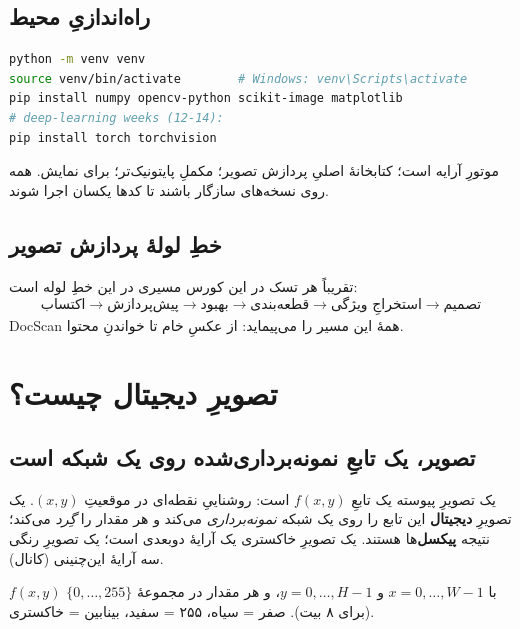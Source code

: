 \documentclass[12pt,a4paper]{article}
\begin{document}
\subsection{راه‌اندازیِ محیط}

\begin{ltrcode}
\begin{lstlisting}[language=bash]
python -m venv venv
source venv/bin/activate        # Windows: venv\Scripts\activate
pip install numpy opencv-python scikit-image matplotlib
# deep-learning weeks (12-14):
pip install torch torchvision
\end{lstlisting}
\end{ltrcode}

 موتورِ آرایه است؛  کتابخانهٔ اصلیِ پردازش تصویر؛  مکملِ
پایتونیک‌تر؛  برای نمایش. همه روی نسخه‌های سازگار باشند تا کدها یکسان اجرا شوند.

\subsection{خطِ لولهٔ پردازش تصویر}

تقریباً هر تسک در این کورس مسیری در این خطِ لوله است:
\[
\text{اکتساب} \rightarrow \text{پیش‌پردازش} \rightarrow \text{بهبود} \rightarrow \text{قطعه‌بندی}
\rightarrow \text{استخراجِ ویژگی} \rightarrow \text{تصمیم}
\]
DocScan همهٔ این مسیر را می‌پیماید: از عکسِ خام تا خواندنِ محتوا.

\section{تصویرِ دیجیتال چیست؟}

\subsection{تصویر، یک تابعِ نمونه‌برداری‌شده روی یک شبکه است}

یک تصویرِ پیوسته یک تابعِ $f(x,y)$ است: روشناییِ نقطه‌ای در موقعیتِ $(x,y)$. یک تصویرِ
\textbf{دیجیتال} این تابع را روی یک شبکه \emph{نمونه‌برداری} می‌کند و هر مقدار را \emph{گِرد}
می‌کند؛ نتیجه \textbf{پیکسل}‌ها هستند. یک تصویرِ خاکستری یک آرایهٔ دوبعدی است؛ یک تصویرِ رنگی سه
آرایهٔ این‌چنینی (کانال).

\begin{riyazi}
$f(x,y)$ با $x = 0,\dots,W{-}1$ و $y = 0,\dots,H{-}1$، و هر مقدار در مجموعهٔ
$\{0,\dots,255\}$ (برای ۸ بیت). صفر = سیاه، ۲۵۵ = سفید، بینابین = خاکستری.
\end{riyazi}
\end{document}
